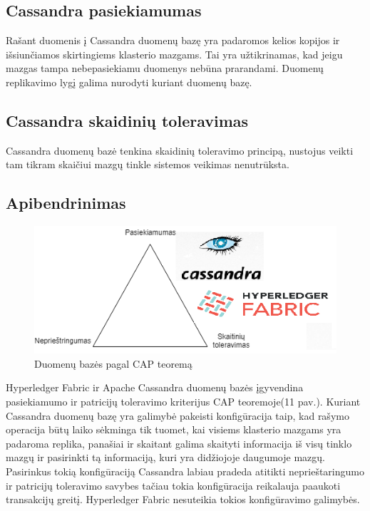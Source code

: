 \documentclass{VUMIFPSkursinis}
\begin{document}
\subsection{Cassandra pasiekiamumas}
Rašant duomenis į Cassandra duomenų bazę yra padaromos kelios kopijos ir išsiunčiamos skirtingiems klasterio mazgams. Tai yra užtikrinamas, kad jeigu mazgas tampa nebepasiekiamu duomenys nebūna prarandami.\cite{CasDesk} Duomenų replikavimo lygį galima nurodyti kuriant duomenų bazę. 
\subsection{Cassandra skaidinių toleravimas}
Cassandra duomenų bazė tenkina skaidinių toleravimo principą, nustojus veikti tam tikram skaičiui mazgų tinkle sistemos veikimas nenutrūksta. \cite{CasDesk} 
\subsection{Apibendrinimas}
\begin{figure}[H]
\centering
\includegraphics[scale=1]{img/CAP}
\caption{Duomenų bazės pagal CAP teoremą} %
\label{img:mlp}
\end{figure}

Hyperledger Fabric ir Apache Cassandra duomenų bazės įgyvendina pasiekiamumo ir patricijų toleravimo kriterijus CAP teoremoje(11 pav.). Kuriant Cassandra duomenų bazę yra galimybė 
pakeisti konfigūracija taip, kad rašymo operacija būtų laiko sėkminga tik tuomet, kai visiems klasterio mazgams yra padaroma replika, panašiai ir skaitant galima skaityti informacija iš visų tinklo mazgų ir pasirinkti tą informaciją, kuri yra didžiojoje daugumoje mazgų. Pasirinkus tokią konfigūraciją Cassandra labiau pradeda atitikti neprieštaringumo ir patricijų toleravimo savybes tačiau tokia konfigūracija reikalauja paaukoti transakcijų greitį. Hyperledger Fabric nesuteikia tokios konfigūravimo galimybės.
\end{document}
